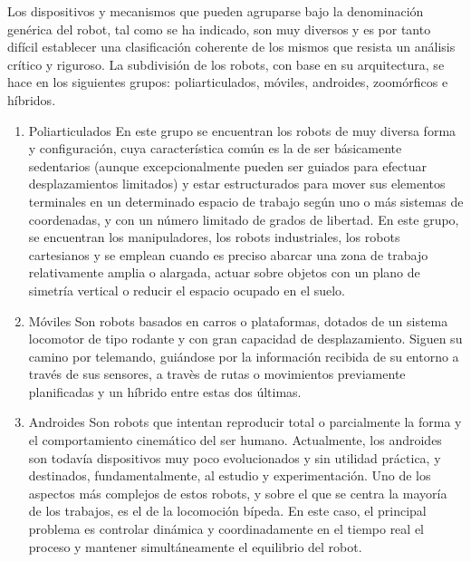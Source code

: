 Los dispositivos y mecanismos que pueden agruparse bajo la denominación genérica del robot, tal como se ha indicado, son muy diversos y es por tanto difícil establecer una clasificación coherente de los mismos que resista un análisis crítico y riguroso. La subdivisión de los robots, con base en su arquitectura, se hace en los siguientes grupos: poliarticulados, móviles, androides, zoomórficos e híbridos.

\begin{enumerate}
	\itemsep1pt \parskip1pt 
	\item Poliarticulados
	En este grupo se encuentran los robots de muy diversa forma y configuración, cuya característica común es la de ser básicamente sedentarios (aunque excepcionalmente pueden ser guiados para efectuar desplazamientos limitados) y estar estructurados para mover sus elementos terminales en un determinado espacio de trabajo según uno o más sistemas de coordenadas, y con un número limitado de grados de libertad. En este grupo, se encuentran los manipuladores, los robots industriales, los robots cartesianos y se emplean cuando es preciso abarcar una zona de trabajo relativamente amplia o alargada, actuar sobre objetos con un plano de simetría vertical o reducir el espacio ocupado en el suelo.

	\item Móviles
	Son robots basados en carros o plataformas, dotados de un sistema locomotor de tipo rodante y con gran capacidad de desplazamiento. Siguen su camino por telemando, guiándose por la información recibida de su entorno a través de sus sensores, a travès de rutas o movimientos previamente planificadas y un híbrido entre estas dos últimas.

	\item Androides
	Son robots que intentan reproducir total o parcialmente la forma y el comportamiento cinemático del ser humano. Actualmente, los androides son todavía dispositivos muy poco evolucionados y sin utilidad práctica, y destinados, fundamentalmente, al estudio y experimentación. Uno de los aspectos más complejos de estos robots, y sobre el que se centra la mayoría de los trabajos, es el de la locomoción bípeda. En este caso, el principal problema es controlar dinámica y coordinadamente en el tiempo real el proceso y mantener simultáneamente el equilibrio del robot.


\end{enumerate}
